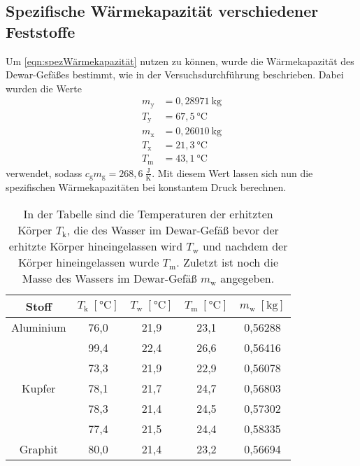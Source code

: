 \documentclass[titlepage = firstcover]{scrartcl}
\begin{document}
        \subsection{Spezifische Wärmekapazität verschiedener Feststoffe}
            Um \eqref{eqn:spezWärmekapazität} nutzen zu können, wurde die Wärmekapazität des Dewar-Gefäßes bestimmt, wie in der Versuchsdurchführung
            beschrieben. Dabei wurden die Werte 
            \begin{align*}
                m_{\text{y}} &= 0,28971 \:\text{kg} \\
                T_{\text{y}} &= 67,5 \:\text{°C} \\
                m_{\text{x}} &= 0,26010 \: \text{kg} \\
                T_{\text{x}} &= 21,3 \:\text{°C} \\
                T_{\text{m}} &= 43,1 \:\text{°C} 
            \end{align*}
            verwendet, sodass $c_\text{g} m_\text{g} = 268,6 \: \frac{\text{J}}{\text{K}}$. Mit diesem Wert lassen sich nun die spezifischen Wärmekapazitäten
            bei konstantem Druck berechnen.
            \begin{table}[h]
                \centering
                \caption{In der Tabelle sind die Temperaturen der erhitzten Körper $T_{\text{k}}$, die des Wasser im Dewar-Gefäß bevor der erhitzte Körper hineingelassen wird $T_{\text{w}}$ und nachdem der Körper hineingelassen wurde $T_{\text{m}}$. Zuletzt ist noch die Masse des Wassers im Dewar-Gefäß $m_{\text{w}}$ angegeben.}
                \label{tab:Tabelle1}

                \begin{tabular}{c c c c c}
                    \toprule
                    {Stoff} & {$T_{\text{k}} \; [\text{°C}] $} & {$T_{\text{w}} \; [\text{°C}]$} &  {$T_{\text{m}} \; [\text{°C}]$} & {$m_{\text{w}} \; [\text{kg}]$}\\
                    \midrule
                    Aluminium & 76,0 & 21,9 & 23,1 & 0,56288 \\
                              & 99,4 & 22,4 & 26,6 & 0,56416 \\
                              & 73,3 & 21,9 & 22,9 & 0,56078 \\
                    Kupfer    & 78,1 & 21,7 & 24,7 & 0,56803 \\
                              & 78,3 & 21,4 & 24,5 & 0,57302 \\
                              & 77,4 & 21,5 & 24,4 & 0,58335 \\
                    Graphit   & 80,0 & 21,4 & 23,2 & 0,56694 \\
                    \bottomrule
                \end{tabular}

            \end{table}
\end{document}

